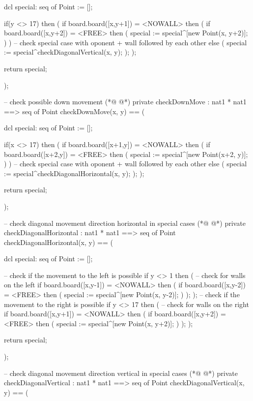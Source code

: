 \begin{vdmpp}[breaklines=true]
   dcl special: seq of Point := [];
   
   if(y <> 17)
   then
   (
    if board.board([x,y+1]) = <NOWALL>
    then
    (
     if board.board([x,y+2]) = <FREE>
     then
     (
      special := special^[new Point(x, y+2)];
     )
    )
    -- check special case with oponent + wall followed by each other
    else
    (
     special := special^checkDiagonalVertical(x, y);
    );
   );
   
   return special;
   
  );
  
  -- check possible down movement
(*@
\label{checkDownMove:349}
@*)
  private checkDownMove : nat1 * nat1 ==> seq of Point
  checkDownMove(x, y) ==
  (
  
   dcl special: seq of Point := [];
  
   if(x <> 17)
   then
   (
    if board.board([x+1,y]) = <NOWALL>
    then
    (
     if board.board([x+2,y]) = <FREE>
     then
     (
      special := special^[new Point(x+2, y)];
     )
    )
    -- check special case with oponent + wall followed by each other
    else
    (
     special := special^checkDiagonalHorizontal(x, y);
    );
   );
   
   return special;
   
  );
  
  -- check diagonal movement direction horizontal in special cases
(*@
\label{checkDiagonalHorizontal:379}
@*)
  private checkDiagonalHorizontal : nat1 * nat1 ==> seq of Point
  checkDiagonalHorizontal(x, y) ==
  (
  
   dcl special: seq of Point := [];
   
   -- check if the movement to the left is possible
   if y <> 1
   then
   (
    -- check for walls on the left
    if board.board([x,y-1]) = <NOWALL>
    then
    (
     if board.board([x,y-2]) = <FREE>
     then
     (
      special := special^[new Point(x, y-2)];
     )
    );
   );
   -- check if the movement to the right is possible
   if y <> 17
   then
   (
    -- check for walls on the right
    if board.board([x,y+1]) = <NOWALL>
    then
    (
     if board.board([x,y+2]) = <FREE>
     then
     (
      special := special^[new Point(x, y+2)];
     )
    );
   );
   
   return special;
   
  );
  
  -- check diagonal movement direction vertical in special cases
(*@
\label{checkDiagonalVertical:421}
@*)
  private checkDiagonalVertical : nat1 * nat1 ==> seq of Point
  checkDiagonalVertical(x, y) ==
  (
  

\end{vdmpp}
